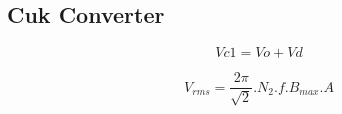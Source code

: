\documentclass[twocolumn]{article}
\begin{document}
\subsection*{\small Cuk Converter}
\small
\begin{equation}
Vc1=Vo+Vd
\end{equation}

\begin{equation}
V_{rms}=\frac{2\pi}{\sqrt{2}}.N_{2}.f.B_{max}.A
\end{equation}



\end{document}

